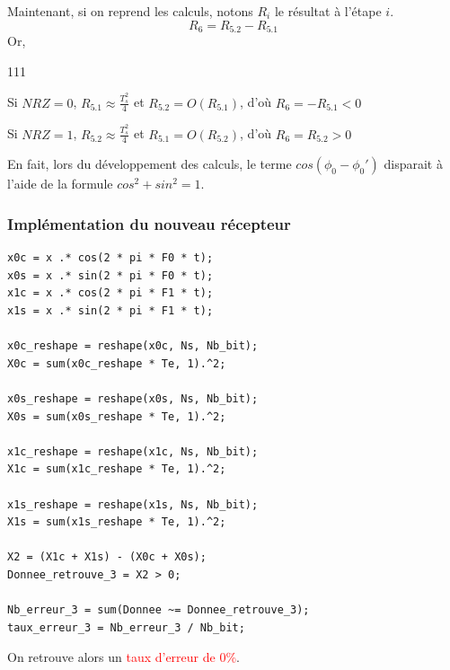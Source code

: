 Maintenant, si on reprend les calculs, notons $R_i$ le résultat à l'étape $i$.
\[
   R_6 = R_{5.2} - R_{5.1}
\]
Or,
\begin{dinglist}{111}
   \item Si $NRZ = 0$, $R_{5.1} \approx \frac{T_s^2}{4}$ et $R_{5.2} = O(R_{5.1})$, d'où $R_6 = - R_{5.1} < 0$
   \item Si $NRZ = 1$, $R_{5.2} \approx \frac{T_s^2}{4}$ et $R_{5.1} = O(R_{5.2})$, d'où $R_6 = R_{5.2} > 0$
\end{dinglist}

En fait, lors du développement des calculs, le terme $cos(\phi_0-\phi_0')$ disparait à l'aide de la formule $cos^2+sin^2=1$.


\subsubsection{Implémentation du nouveau récepteur}
\begin{lstlisting}[caption=Récepteur V21 avec déphasage, label=code:syn-dephasage]
x0c = x .* cos(2 * pi * F0 * t);
x0s = x .* sin(2 * pi * F0 * t);
x1c = x .* cos(2 * pi * F1 * t);
x1s = x .* sin(2 * pi * F1 * t);

x0c_reshape = reshape(x0c, Ns, Nb_bit);
X0c = sum(x0c_reshape * Te, 1).^2;

x0s_reshape = reshape(x0s, Ns, Nb_bit);
X0s = sum(x0s_reshape * Te, 1).^2;

x1c_reshape = reshape(x1c, Ns, Nb_bit);
X1c = sum(x1c_reshape * Te, 1).^2;

x1s_reshape = reshape(x1s, Ns, Nb_bit);
X1s = sum(x1s_reshape * Te, 1).^2;

X2 = (X1c + X1s) - (X0c + X0s);
Donnee_retrouve_3 = X2 > 0;

Nb_erreur_3 = sum(Donnee ~= Donnee_retrouve_3);
taux_erreur_3 = Nb_erreur_3 / Nb_bit;
\end{lstlisting}

On retrouve alors un \textcolor{Red}{taux d'erreur de 0\%}.